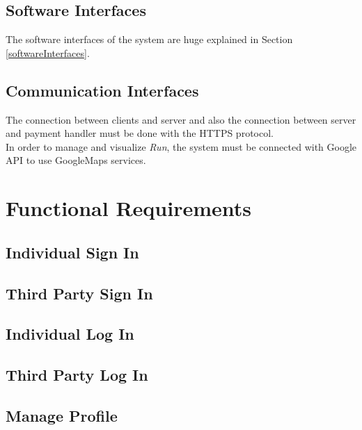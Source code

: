 \subsection{Software Interfaces}
The software interfaces of the system are huge explained in Section \ref{softwareInterfaces}.

\subsection{Communication Interfaces}
The connection between clients and server and also the connection between server and payment handler must be done with the HTTPS protocol.\\
In order to manage and visualize \textit{Run}, the system must be connected with Google API to use GoogleMaps services.

\clearpage
\section{Functional Requirements}

\subsection{Individual Sign In}\label{individualLogIn}

\clearpage

\subsection{Third Party Sign In}

\clearpage

\subsection{Individual Log In}

\clearpage

\subsection{Third Party Log In}

\clearpage

\subsection{Manage Profile}

\clearpage

